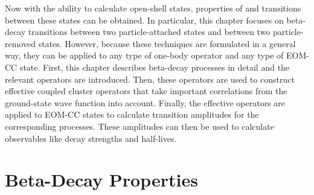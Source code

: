 \documentclass[thesis.tex]{subfiles}
\begin{document}
Now with the ability to calculate open-shell states, properties of and transitions between these states can be obtained.  In particular, this chapter focuses on beta-decay transitions between two particle-attached states and between two particle-removed states.  However, because these techniques are formulated in a general way, they can be applied to any type of one-body operator and any type of EOM-CC state.  First, this chapter describes beta-decay processes in detail and the relevant operators are introduced.  Then, these operators are used to construct effective coupled cluster operators that take important correlations from the ground-state wave function into account.  Finally, the effective operators are applied to EOM-CC states to calculate transition amplitudes for the corresponding processes.  These amplitudes can then be used to calculate observables like decay strengths and half-lives.

\section{Beta-Decay Properties} \label{section:betaproperties}
\end{document}
